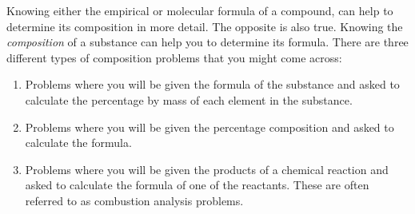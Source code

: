 Knowing either the empirical or molecular formula of a compound, can help to determine its composition in more detail. The opposite is also true. Knowing the \textit{composition} of a substance can help you to determine its formula. There are three different types of composition problems that you might come across:

\begin{enumerate}
\item Problems where you will be given the formula of the substance and asked to calculate the percentage by mass of each element in the substance.
\item Problems where you will be given the percentage composition and asked to calculate the formula.
\item Problems where you will be given the products of a chemical reaction and asked to calculate the formula of one of the reactants. These are often referred to as combustion analysis problems.
\end{enumerate}
